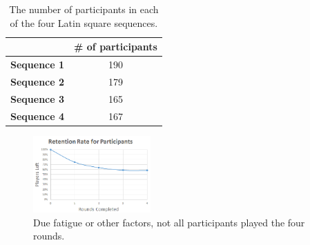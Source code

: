 \begin{table}[htbp]
\scriptsize
\centering
\begin{tabular}{|c|c|}
\hline
 & \textbf{\# of participants}\\
 \hline
\textbf{Sequence 1} & 190\\
\hline
\textbf{Sequence 2} & 179\\
\hline
\textbf{Sequence 3} & 165\\
\hline
\textbf{Sequence 4} & 167\\
\hline
\end{tabular}
\caption{The number of participants in each of the four Latin square sequences.}
\label{table:latinSequenceNumber}
\end{table}

\begin{figure}[htbp]
\centering
\includegraphics[width=0.4\textwidth]{Pics/retetionRate}
\caption{Due fatigue or other factors, not all participants played the four rounds.}
\label{fig:retention}
\end{figure}



